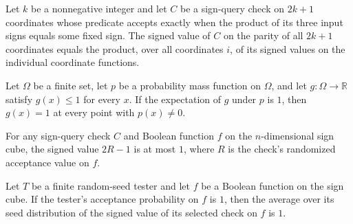 \begin{theorem}
\label{FABL.e3LinCheckSignedValue_oddParity}
\leanok
{}
Let $k$ be a nonnegative integer and let $C$ be a sign-query check on $2k+1$ coordinates
whose predicate accepts exactly when the product of its three input signs equals some
fixed sign. The signed value of $C$ on the parity of all $2k+1$ coordinates equals the
product, over all coordinates $i$, of its signed values on the individual coordinate
functions.
\end{theorem}

\begin{theorem}
\label{FABL.eq_one_on_pmf_support}
\leanok
{}
Let $\Omega$ be a finite set, let $p$ be a probability mass function on $\Omega$, and
let $g:\Omega\to\mathbb R$ satisfy $g(x)\le 1$ for every $x$. If the expectation of
$g$ under $p$ is $1$, then $g(x)=1$ at every point with $p(x)\ne 0$.
\end{theorem}

\begin{theorem}
\label{FABL.e3LinCheckSignedValue_le_one}
\leanok
{}
For any sign-query check $C$ and Boolean function $f$ on the $n$-dimensional sign cube,
the signed value $2R-1$ is at most $1$, where $R$ is the check's randomized acceptance
value on $f$.
\end{theorem}

\begin{theorem}
\label{FABL.expect_e3LinCheckSignedValue_eq_one}
\leanok
{}
Let $T$ be a finite random-seed tester and let $f$ be a Boolean function on the sign
cube. If the tester's acceptance probability on $f$ is $1$, then the average over its
seed distribution of the signed value of its selected check on $f$ is $1$.
\end{theorem}

